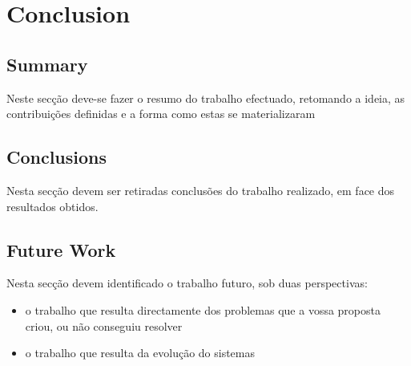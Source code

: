 \chapter{Conclusion}\label{conclusion}

\section{Summary}
Neste secção deve-se fazer o resumo do trabalho efectuado, retomando a ideia, as
contribuições definidas e a forma como estas se materializaram

\section{Conclusions}
Nesta secção devem ser retiradas conclusões do trabalho realizado, em face dos
resultados obtidos.

\section{Future Work}
Nesta secção devem identificado o trabalho futuro, sob duas perspectivas:

\begin{itemize}
\item o trabalho que resulta directamente dos problemas que a vossa proposta criou, ou não conseguiu resolver
\item o trabalho que resulta da evolução do sistemas
\end{itemize}
